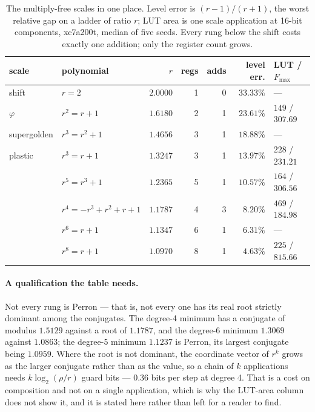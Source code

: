 \begin{table}[t]\centering
\caption{The multiply-free scales in one place. Level error is $(r-1)/(r+1)$,
the worst relative gap on a ladder of ratio $r$; LUT area is one scale
application at 16-bit components, xc7a200t, median of five seeds. Every rung
below the shift costs exactly one addition; only the register count grows.}
\label{tab:allscales}
\begin{tabular}{llrrrrl}
\toprule
scale & polynomial & $r$ & regs & adds & level err. & LUT / $F_{\max}$ \\
\midrule
shift        & $r=2$              & $2.0000$ & 1 & 0 & $33.33\%$ & --- \\
$\varphi$    & $r^2=r+1$          & $1.6180$ & 2 & 1 & $23.61\%$ & $149$ / $307.69$ \\
supergolden  & $r^3=r^2+1$        & $1.4656$ & 3 & 1 & $18.88\%$ & --- \\
plastic      & $r^3=r+1$          & $1.3247$ & 3 & 1 & $13.97\%$ & $228$ / $231.21$ \\
             & $r^5=r^3+1$        & $1.2365$ & 5 & 1 & $10.57\%$ & $164$ / $306.56$ \\
             & $r^4{=}{-}r^3{+}r^2{+}r{+}1$ & $1.1787$ & 4 & 3 & $8.20\%$ & $469$ / $184.98$ \\
             & $r^6=r+1$          & $1.1347$ & 6 & 1 & $6.31\%$ & --- \\
             & $r^8=r+1$          & $1.0970$ & 8 & 1 & $4.63\%$ & $225$ / $815.66$ \\
\bottomrule
\end{tabular}
\end{table}

\paragraph{A qualification the table needs.} Not every rung is Perron --- that
is, not every one has its real root strictly dominant among the conjugates. The
degree-4 minimum has a conjugate of modulus $1.5129$ against a root of
$1.1787$, and the degree-6 minimum $1.3069$ against $1.0863$; the degree-5
minimum $1.1237$ is Perron, its largest conjugate being $1.0959$. Where the
root is not dominant, the coordinate vector of $r^{k}$ grows as the larger
conjugate rather than as the value, so a chain of $k$ applications needs
$k\log_2(\rho/r)$ guard bits --- $0.36$ bits per step at degree 4. That is a cost
on composition and not on a single application, which is why the LUT-area column
does not show it, and it is stated here rather than left for a reader to find.

